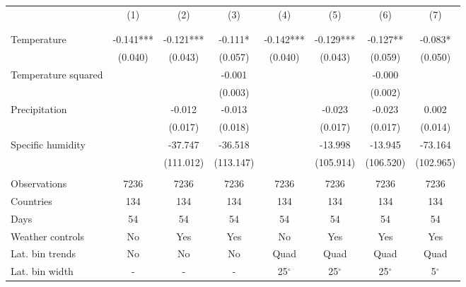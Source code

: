 \begin{tabular}{lccccccc} \hline
 & (1) & (2) & (3) & (4) & (5) & (6) & (7) \\
& &  &  &  &  &  &  \\ \hline
 &  &  &  &  &  &  &  \\
Temperature & -0.141*** & -0.121*** & -0.111* & -0.142*** & -0.129*** & -0.127** & -0.083* \\
 & (0.040) & (0.043) & (0.057) & (0.040) & (0.043) & (0.059) & (0.050) \\
Temperature squared &  &  & -0.001 &  &  & -0.000 &  \\
 &  &  & (0.003) &  &  & (0.002) &  \\
Precipitation &  & -0.012 & -0.013 &  & -0.023 & -0.023 & 0.002 \\
 &  & (0.017) & (0.018) &  & (0.017) & (0.017) & (0.014) \\
Specific humidity &  & -37.747 & -36.518 &  & -13.998 & -13.945 & -73.164 \\
 &  & (111.012) & (113.147) &  & (105.914) & (106.520) & (102.965) \\
 &  &  &  &  &  &  &  \\
Observations & 7236 & 7236 & 7236 & 7236 & 7236 & 7236 & 7236 \\
Countries & 134 & 134 & 134 & 134 & 134 & 134 & 134 \\
Days & 54 & 54 & 54 & 54 & 54 & 54 & 54 \\
Weather controls & No & Yes & Yes & No & Yes & Yes & Yes \\
Lat. bin trends & No & No & No & Quad & Quad & Quad & Quad \\
 Lat. bin width & - & - & - & 25$ ^\circ$ & 25$ ^\circ$ & 25$ ^\circ$ & 5$ ^\circ$ \\ \hline
\end{tabular}
